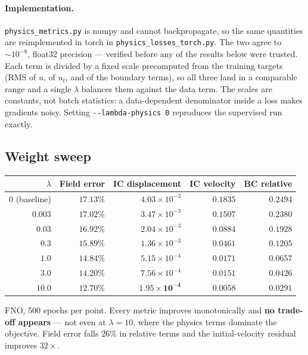 \documentclass[11pt,a4paper]{article}
\begin{document}
\paragraph{Implementation.} \texttt{physics\_metrics.py} is numpy and cannot
backpropagate, so the same quantities are reimplemented in torch in
\texttt{physics\_losses\_torch.py}. The two agree to $\sim\!10^{-8}$, float32
precision --- verified before any of the results below were trusted. Each term is
divided by a fixed scale precomputed from the training targets (RMS of $u$, of
$u_t$, and of the boundary terms), so all three land in a comparable range and a
single $\lambda$ balances them against the data term. The scales are constants,
not batch statistics: a data-dependent denominator inside a loss makes gradients
noisy. Setting \texttt{-{}-lambda-physics 0} reproduces the supervised run
exactly.

\subsection{Weight sweep}

\begin{center}
\small
\begin{tabular}{rrrrr}
\toprule
$\lambda$ & \textbf{Field error} & \textbf{IC displacement} & \textbf{IC velocity} & \textbf{BC relative}\\
\midrule
$0$ (baseline) & $17.13\%$ & $4.03\times10^{-3}$ & $0.1835$ & $0.2494$\\
$0.003$        & $17.02\%$ & $3.47\times10^{-3}$ & $0.1507$ & $0.2380$\\
$0.03$         & $16.92\%$ & $2.04\times10^{-3}$ & $0.0884$ & $0.1928$\\
$0.3$          & $15.89\%$ & $1.36\times10^{-3}$ & $0.0461$ & $0.1205$\\
$1.0$          & $14.84\%$ & $5.15\times10^{-4}$ & $0.0171$ & $0.0657$\\
$3.0$          & $14.20\%$ & $7.56\times10^{-4}$ & $0.0151$ & $0.0426$\\
$10.0$         & $\mathbf{12.70\%}$ & $\mathbf{1.95\times10^{-4}}$ & $\mathbf{0.0058}$ & $\mathbf{0.0291}$\\
\bottomrule
\end{tabular}
\end{center}

\noindent FNO, 500 epochs per point. Every metric improves monotonically and
\textbf{no trade-off appears} --- not even at $\lambda=10$, where the physics
terms dominate the objective. Field error falls $26\%$ in relative terms and the
initial-velocity residual improves $32\times$.
\end{document}
